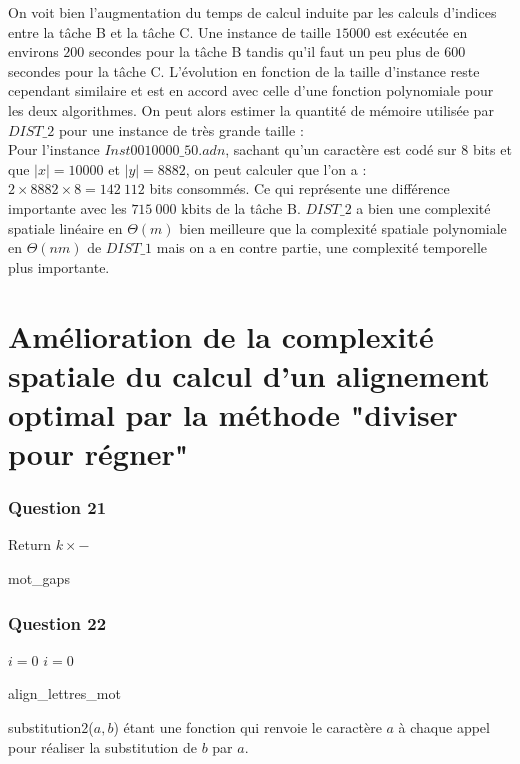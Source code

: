 \documentclass[12pt, a4paper]{report}
\begin{document}
On voit bien l'augmentation du temps de calcul induite par les calculs d'indices entre la tâche B et la tâche C. Une instance de taille $15000$ est exécutée en environs $200$ secondes pour la tâche B tandis qu'il faut un peu plus de $600$ secondes pour la tâche C. L'évolution en fonction de la taille d'instance reste cependant similaire et est en accord avec celle d'une fonction polynomiale pour les deux algorithmes.
On peut alors estimer la quantité de mémoire utilisée par $DIST\_2$ pour une instance de très grande taille :\\
Pour l'instance $Inst0010000\_50.adn$, sachant qu'un caractère est codé sur $8$ bits et que $|x|=10000$ et $|y|=8882$, on peut calculer que l'on a :\\
$2\times 8882 \times 8=142\ 112$ bits consommés. Ce qui représente une différence importante avec les  $715\ 000 \text{ kbits}$ de la tâche B. $DIST\_2$ a bien une complexité spatiale linéaire en $\Theta(m)$ bien meilleure que la complexité spatiale polynomiale en $\Theta(nm)$ de $DIST\_1$ mais on a en contre partie, une complexité temporelle plus importante.
\section{Amélioration de la complexité spatiale du calcul d'un alignement optimal par la méthode "diviser pour régner"}

\subsubsection{Question 21}
\begin{algorithm}[H]
\SetAlgoLined
{}
Return $k \times -$\;
\caption{mot\_gaps}
\end{algorithm}

\subsubsection{Question 22}
\begin{algorithm}[H]
\SetAlgoLined
{}
$i = 0$\;
$i=0$\;
\caption{align\_lettres\_mot}
\end{algorithm}
substitution2($a,b$) étant une fonction qui renvoie le caractère $a$ à chaque appel pour réaliser la substitution de $b$ par $a$. \\
\end{document}
